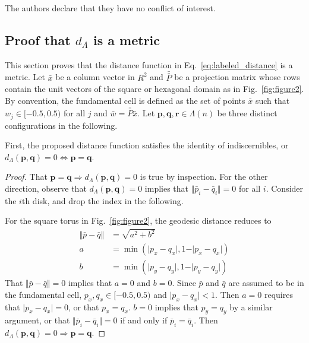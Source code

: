 \documentclass[default,iicol]{sn-jnl}%
\theoremstyle{thmstyleone}%
\theoremstyle{thmstyletwo}%
\theoremstyle{thmstylethree}%
\renewcommand{\vec}[1]{\bar{#1}}
\providecommand{\mat}[1]{\bar{\bar{#1}}}
\providecommand{\config}[1]{\mathbf{#1}}
\begin{document}
 The  authors  declare  that  they  have  no  conflict  of interest.

\begin{appendices}
	
	\section{Proof that $d_\Lambda$ is a metric}
	\label{sec:metric_proofs}
	
	This section proves that the distance function in Eq.\ \ref{eq:labeled_distance} is a metric. Let $\vec{x}$ be a column vector in $R^2$ and $\mat{P}$ be a projection matrix whose rows contain the unit vectors of the square or hexagonal domain as in Fig.\ \ref{fig:figure2}. By convention, the fundamental cell is defined as the set of points $\vec{x}$ such that $w_j \in [-0.5, 0.5)$ for all $j$ and $\vec{w} = \mat{P} \vec{x}$. Let $\config{p}, \config{q}, \config{r} \in \Lambda(n)$ be three distinct configurations in the following.

	First, the proposed distance function satisfies the identity of indiscernibles, or $d_\Lambda(\config{p},\config{q}) = 0 \iff \config{p} = \config{q}$.
	
	\begin{proof}
		That $\config{p} = \config{q} \Longrightarrow d_\Lambda(\config{p},\config{q}) = 0$ is true by inspection. For the other direction, observe that $d_\Lambda(\config{p}, \config{q}) = 0$ implies that $\Vert \vec{p}_i - \vec{q}_i \Vert = 0$ for all $i$. Consider the $i$th disk, and drop the index in the following. 
		
		For the square torus in Fig.\ \ref{fig:figure2}, the geodesic distance reduces to
		\begin{align*}
			\Vert \vec{p} - \vec{q} \Vert &= \sqrt{a^2 + b^2} \nonumber \\
			a &= \min{(\rvert p_x - q_x \lvert, 1 - \rvert p_x - q_x \lvert)} \nonumber \\
			b &= \min{(\rvert p_y - q_y \lvert, 1 - \rvert p_y - q_y \lvert)}  \label{eq:app_formula_1}
		\end{align*}
		That $\Vert \vec{p} - \vec{q} \Vert = 0$ implies that $a = 0$ and $b = 0$. Since $\vec{p}$ and $\vec{q}$ are assumed to be in the fundamental cell, $p_x, q_x \in [-0.5, 0.5)$ and $\lvert p_x - q_x \rvert < 1$. Then $a = 0$ requires that $\lvert p_x - q_x \rvert = 0$, or that $p_x = q_x$. $b = 0$ implies that $p_y = q_y$ by a similar argument, or that $\Vert \vec{p}_i - \vec{q}_i \Vert = 0$ if and only if $\vec{p}_i = \vec{q}_i$. Then $d_\Lambda(\config{p}, \config{q}) = 0 \Longrightarrow \config{p} = \config{q}$.
		

\end{proof}
\end{appendices}
\end{document}
